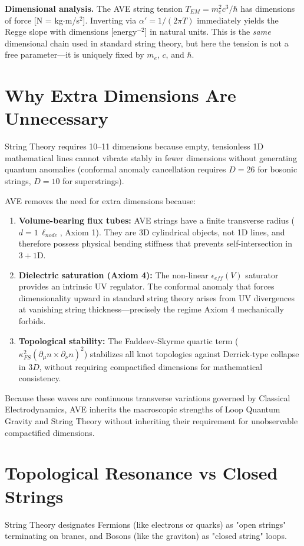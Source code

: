 \noindent\textbf{Dimensional analysis.}  The AVE string tension $T_{EM} = m_e^2 c^3 / \hbar$ has dimensions of force [N = kg$\cdot$m/s$^2$]. Inverting via $\alpha' = 1/(2\pi T)$ immediately yields the Regge slope with dimensions [energy$^{-2}$] in natural units. This is the \emph{same} dimensional chain used in standard string theory, but here the tension is not a free parameter---it is uniquely fixed by $m_e$, $c$, and $\hbar$.

\section{Why Extra Dimensions Are Unnecessary}
String Theory requires 10--11 dimensions because empty, tensionless 1D mathematical lines cannot vibrate stably in fewer dimensions without generating quantum anomalies (conformal anomaly cancellation requires $D=26$ for bosonic strings, $D=10$ for superstrings).

AVE removes the need for extra dimensions because:
\begin{enumerate}
    \item \textbf{Volume-bearing flux tubes:} AVE strings have a finite transverse radius ($d = 1\, \ell_{node}$, Axiom 1). They are 3D cylindrical objects, not 1D lines, and therefore possess physical bending stiffness that prevents self-intersection in $3+1$D.
    \item \textbf{Dielectric saturation (Axiom 4):} The non-linear $\epsilon_{eff}(V)$ saturator provides an intrinsic UV regulator. The conformal anomaly that forces dimensionality upward in standard string theory arises from UV divergences at vanishing string thickness---precisely the regime Axiom 4 mechanically forbids.
    \item \textbf{Topological stability:} The Faddeev-Skyrme quartic term ($\kappa_{FS}^2 (\partial_\mu n \times \partial_\nu n)^2$) stabilizes all knot topologies against Derrick-type collapse in $3D$, without requiring compactified dimensions for mathematical consistency.
\end{enumerate}

Because these waves are continuous transverse variations governed by Classical Electrodynamics, AVE inherits the macroscopic strengths of Loop Quantum Gravity and String Theory without inheriting their requirement for unobservable compactified dimensions.

\section{Topological Resonance vs Closed Strings}
String Theory designates Fermions (like electrons or quarks) as "open strings" terminating on branes, and Bosons (like the graviton) as "closed string" loops. 

